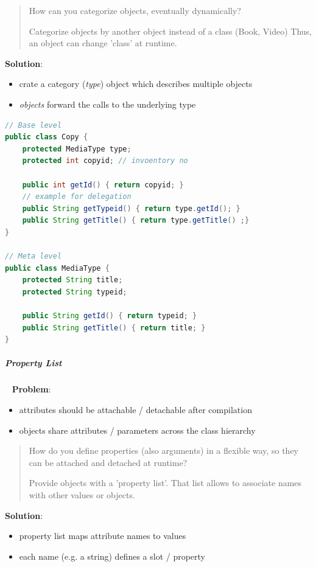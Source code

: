 \documentclass[8pt,twoside,landscape]{extarticle}
\begin{document}
\begin{multicols}{4}
\begin{quote}
How can you categorize objects, eventually dynamically?

Categorize objects by another object instead of a class (Book, Video)
Thus, an object can change 'class' at runtime.
\end{quote}


\textbf{Solution}:
\begin{itemize}
\item crate a category (\emph{type}) object which describes multiple objects
\item \emph{objects} forward the calls to the underlying type
\end{itemize}


\begin{lstlisting}[language=java,label=lst:example-for-type-object,caption={Example for Type Object},captionpos=b,numbers=none]
// Base level
public class Copy {
    protected MediaType type;
    protected int copyid; // invoentory no

    public int getId() { return copyid; }
    // example for delegation
    public String getTypeid() { return type.getId(); }
    public String getTitle() { return type.getTitle() ;}
}

// Meta level
public class MediaType {
    protected String title;
    protected String typeid;

    public String getId() { return typeid; }
    public String getTitle() { return title; }
}
\end{lstlisting}
\subparagraph{Property List} \
\label{sec:orgb968156}
\textbf{Problem}:
\begin{itemize}
\item attributes should be attachable / detachable after compilation
\item objects share attributes / parameters across the class hierarchy
\end{itemize}


\begin{quote}
How do you define properties (also arguments) in a flexible way, so they can be attached and detached at runtime?

Provide objects with a 'property list'. That list allows to associate names with other values or objects.
\end{quote}


\textbf{Solution}:
\begin{itemize}
\item property list maps attribute names to values
\item each name (e.g. a string) defines a slot / property
\end{itemize}


\end{multicols}
\end{document}
